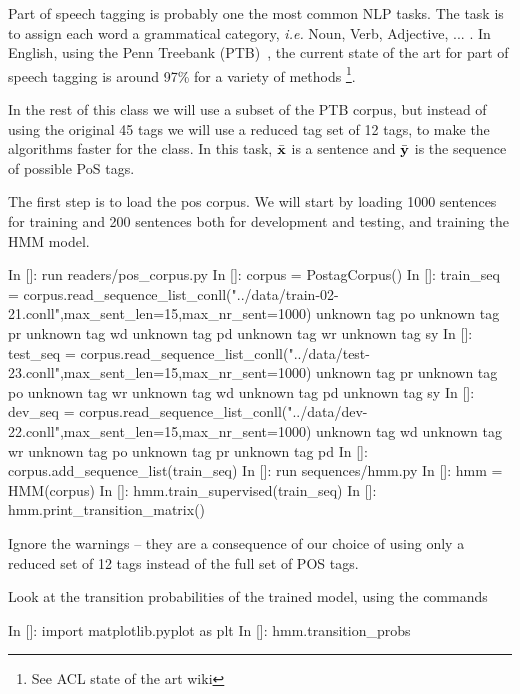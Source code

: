 Part of speech tagging is probably one the most common NLP tasks. The
task is to assign each word a grammatical category, \emph{i.e.} Noun,
Verb, Adjective, ... . In English, using the Penn Treebank (PTB)~\citep{pennTreeBank}, the current
state of the art for part of speech tagging is around 97\% for a
variety of methods \footnote{See ACL state of the art wiki}.

In the rest of this class we will use a subset of the PTB corpus, but
instead of using the original 45 tags we will use a reduced tag set of
12 tags, to make the algorithms faster for the
class. In this task, $\bar{\mathbf{x}}$ is a sentence and $\bar{\mathbf{y}}$
is the sequence of possible PoS tags.

The first step is to load the pos corpus. We will start by loading
1000 sentences for training and 200 sentences both for development and
testing, and training the HMM model.
\begin{python}
In []: run readers/pos_corpus.py
In []: corpus = PostagCorpus()
In []: train_seq = corpus.read_sequence_list_conll("../data/train-02-21.conll",max_sent_len=15,max_nr_sent=1000)
unknown tag po
unknown tag pr
unknown tag wd
unknown tag pd
unknown tag wr
unknown tag sy
In []: test_seq = corpus.read_sequence_list_conll("../data/test-23.conll",max_sent_len=15,max_nr_sent=1000)
unknown tag pr
unknown tag po
unknown tag wr
unknown tag wd
unknown tag pd
unknown tag sy
In []: dev_seq = corpus.read_sequence_list_conll("../data/dev-22.conll",max_sent_len=15,max_nr_sent=1000)
unknown tag wd
unknown tag wr
unknown tag po
unknown tag pr
unknown tag pd
In []: corpus.add_sequence_list(train_seq) 
In []: run sequences/hmm.py
In []: hmm = HMM(corpus)
In []: hmm.train_supervised(train_seq)
In []: hmm.print_transition_matrix()
\end{python}

Ignore the warnings -- they are a consequence of our choice of using only a reduced set of 12 tags instead of the full set of POS tags.


Look at the transition probabilities of the trained model, using the commands
\begin{python}
In []: import matplotlib.pyplot as plt
In []: hmm.transition_probs
\end{python}

